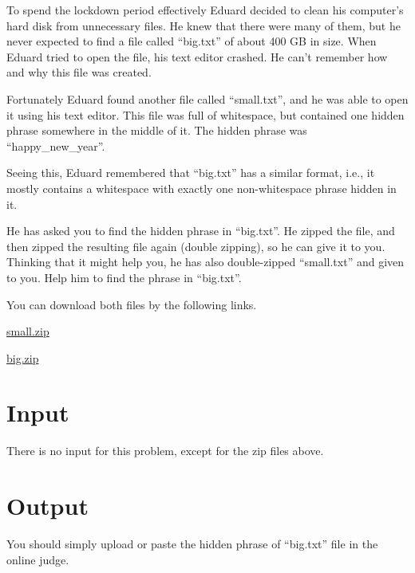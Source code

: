 To spend the lockdown period effectively Eduard decided to clean his computer's hard disk from unnecessary files.
He knew that there were many of them, but he never expected to find a file called ``big.txt'' of about 400 GB in size.
When Eduard tried to open the file, his text editor crashed.
He can't remember how and why this file was created.

Fortunately Eduard found another file called ``small.txt'', and he was able to open it using his text editor.
This file was full of whitespace, but contained one hidden phrase somewhere in the middle of it.
The hidden phrase was ``happy\_new\_year''.

Seeing this, Eduard remembered that ``big.txt'' has a similar format, i.e., it mostly contains a whitespace with exactly one non-whitespace phrase hidden in it.

He has asked you to find the hidden phrase in ``big.txt''.
He zipped the file, and then zipped the resulting file again (double zipping), so he can give it to you.
Thinking that it might help you, he has also double-zipped ``small.txt'' and given to you.
Help him to find the phrase in ``big.txt''.

You can download both files by the following links.
\begin{center}
    \href{http://167.71.248.201/ejudge/small.zip}{small.zip}
    
    \href{http://167.71.248.201/ejudge/big.zip}{big.zip}
\end{center}

\section*{Input}
There is no input for this problem, except for the zip files above.

\section*{Output}
You should simply upload or paste the hidden phrase of ``big.txt'' file in the online judge.
